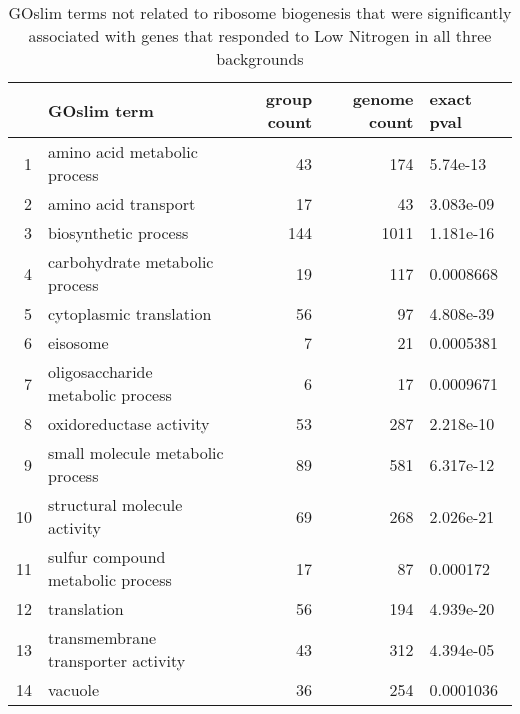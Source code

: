 \begin{table}[H]
\centering
\begin{tabular}{rlrrl}
  \hline
 & GOslim term & group count & genome count & exact pval \\ 
  \hline
1 & amino acid metabolic process & 43 & 174 & 5.74e-13 \\ 
  2 & amino acid transport & 17 & 43 & 3.083e-09 \\ 
  3 & biosynthetic process & 144 & 1011 & 1.181e-16 \\ 
  4 & carbohydrate metabolic process & 19 & 117 & 0.0008668 \\ 
  5 & cytoplasmic translation & 56 & 97 & 4.808e-39 \\ 
  6 & eisosome & 7 & 21 & 0.0005381 \\ 
  7 & oligosaccharide metabolic process & 6 & 17 & 0.0009671 \\ 
  8 & oxidoreductase activity & 53 & 287 & 2.218e-10 \\ 
  9 & small molecule metabolic process & 89 & 581 & 6.317e-12 \\ 
  10 & structural molecule activity & 69 & 268 & 2.026e-21 \\ 
  11 & sulfur compound metabolic process & 17 & 87 & 0.000172 \\ 
  12 & translation & 56 & 194 & 4.939e-20 \\ 
  13 & transmembrane transporter activity & 43 & 312 & 4.394e-05 \\ 
  14 & vacuole & 36 & 254 & 0.0001036 \\ 
   \hline
\end{tabular}
\caption{GOslim terms not related to ribosome biogenesis that were significantly associated with genes that responded to Low Nitrogen in all three backgrounds}
    \label{tab:goslim_conserved}
\end{table}

